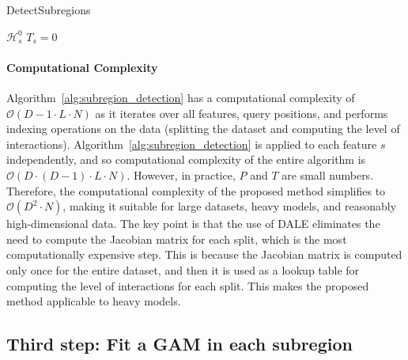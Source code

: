 \documentclass[runningheads]{llncs}
\begin{document}
\begin{algorithm}
\caption{DetectSubregions}
\label{alg:subregion_detection}
\SetAlgoLined
{}
\BlankLine
{}
\BlankLine
{}
\BlankLine
$\mathcal{H}_s^0$ 
$T_s = 0$ 
\end{algorithm}


\paragraph{Computational Complexity}


Algorithm~\ref{alg:subregion_detection} has a computational complexity of $\mathcal{O}(D-1 \cdot L \cdot N)$
as it iterates over all features, query positions, and performs indexing operations on the data (splitting the dataset and computing the level of interactions).
Algorithm~\ref{alg:subregion_detection} is applied to each feature $s$ independently, and so computational complexity of the entire algorithm is $\mathcal{O}(D \cdot (D-1) \cdot L \cdot N)$.
However, in practice, $P$ and $T$ are small numbers.
Therefore, the computational complexity of the proposed method simplifies to $\mathcal{O}(D^2 \cdot N)$,
making it suitable for large datasets, heavy models, and reasonably high-dimensional data.
The key point is that the use of DALE eliminates the need to compute the Jacobian matrix for each split,
which is the most computationally expensive step.
This is because the Jacobian matrix is computed only once for the entire dataset, and then it is used as a lookup table for computing the level of interactions for each split.
This makes the proposed method applicable to heavy models.

\subsection{Third step: Fit a GAM in each subregion}
\label{subsec:fitting_gams}
\end{document}
